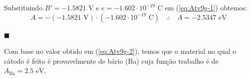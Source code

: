 \documentclass[12pt,a4paper]{article}
\begin{document}
\begin{enumerate}[label = \alph*)]
        Substituindo $B'=-1.5821\text{ V}$ e $e=-1.602\cdot10^{-19}\text{ C}$ em (\ref{eq:Atv9g-1}) obtemos:
        \begin{equation}\label{eq:Atv9g-2}
            A=-\left(-1.5821\text{ V}\right)\cdot\left(-1.602\cdot10^{-19}\text{ C}\right)\quad\therefore\quad\boxed{A=-2.5347\text{ eV}}
        \end{equation}
        \begin{flushright}
            $\blacksquare$
        \end{flushright}

        Com base no valor obtido em (\ref{eq:Atv9g-2}), temos que o material no qual o cátodo é feito é provavelmente de bário (Ba) cuja função trabalho é de $A_{\text{Ba}}=2.5\text{ eV}$.
        
    \end{enumerate}



\noindent\makebox[\linewidth]{\rule{\paperwidth}{0.4pt}}
\end{document}
